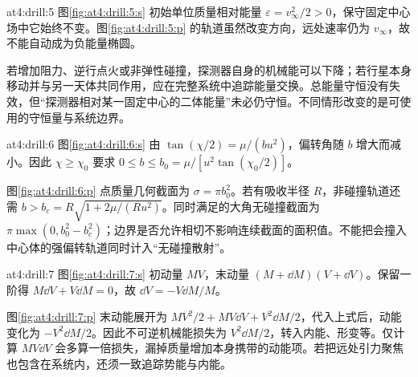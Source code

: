 \begin{drillsolution}{at4:drill:5}
  图\ref{fig:at4:drill:5:s} 初始单位质量相对能量 $\varepsilon=v_\infty^2/2>0$，保守固定中心场中它始终不变。图\ref{fig:at4:drill:5:p} 的轨道虽然改变方向，远处速率仍为 $v_\infty$，故不能自动成为负能量椭圆。

  若增加阻力、逆行点火或非弹性碰撞，探测器自身的机械能可以下降；若行星本身移动并与另一天体共同作用，应在完整系统中追踪能量交换。总能量守恒没有失效，但“探测器相对某一固定中心的二体能量”未必仍守恒。不同情形改变的是可使用的守恒量与系统边界。\end{drillsolution}
\begin{drillsolution}{at4:drill:6}
  图\ref{fig:at4:drill:6:s} 由 $\tan(\chi/2)=\mu/(bu^2)$，偏转角随 $b$ 增大而减小。因此 $\chi\ge\chi_0$ 要求 $0\le b\le b_0=\mu/[u^2\tan(\chi_0/2)]$。

  图\ref{fig:at4:drill:6:p} 点质量几何截面为 $\sigma=\pi b_0^2$。若有吸收半径 $R$，非碰撞轨道还需 $b>b_c=R\sqrt{1+2\mu/(Ru^2)}$。同时满足的大角无碰撞截面为 $\pi\max(0,b_0^2-b_c^2)$；边界是否允许相切不影响连续截面的面积值。不能把会撞入中心体的强偏转轨道同时计入“无碰撞散射”。\end{drillsolution}
\begin{drillsolution}{at4:drill:7}
  图\ref{fig:at4:drill:7:s} 初动量 $MV$，末动量 $(M+\dd M)(V+\dd V)$。保留一阶得 $M\dd V+V\dd M=0$，故 $\dd V=-V\dd M/M$。

  图\ref{fig:at4:drill:7:p} 末动能展开为 $MV^2/2+MV\dd V+V^2\dd M/2$，代入上式后，动能变化为 $-V^2\dd M/2$。因此不可逆机械能损失为 $V^2\dd M/2$，转入内能、形变等。仅计算 $MV\dd V$ 会多算一倍损失，漏掉质量增加本身携带的动能项。若把远处引力聚焦也包含在系统内，还须一致追踪势能与内能。\end{drillsolution}
